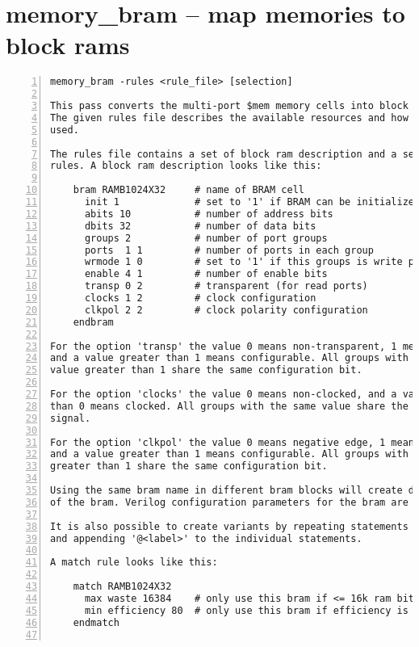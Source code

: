 \section{memory\_bram -- map memories to block rams}
\label{cmd:memory_bram}
\begin{lstlisting}[numbers=left,frame=single]
    memory_bram -rules <rule_file> [selection]

This pass converts the multi-port $mem memory cells into block ram instances.
The given rules file describes the available resources and how they should be
used.

The rules file contains a set of block ram description and a sequence of match
rules. A block ram description looks like this:

    bram RAMB1024X32     # name of BRAM cell
      init 1             # set to '1' if BRAM can be initialized
      abits 10           # number of address bits
      dbits 32           # number of data bits
      groups 2           # number of port groups
      ports  1 1         # number of ports in each group
      wrmode 1 0         # set to '1' if this groups is write ports
      enable 4 1         # number of enable bits
      transp 0 2         # transparent (for read ports)
      clocks 1 2         # clock configuration
      clkpol 2 2         # clock polarity configuration
    endbram

For the option 'transp' the value 0 means non-transparent, 1 means transparent
and a value greater than 1 means configurable. All groups with the same
value greater than 1 share the same configuration bit.

For the option 'clocks' the value 0 means non-clocked, and a value greater
than 0 means clocked. All groups with the same value share the same clock
signal.

For the option 'clkpol' the value 0 means negative edge, 1 means positive edge
and a value greater than 1 means configurable. All groups with the same value
greater than 1 share the same configuration bit.

Using the same bram name in different bram blocks will create different variants
of the bram. Verilog configuration parameters for the bram are created as needed.

It is also possible to create variants by repeating statements in the bram block
and appending '@<label>' to the individual statements.

A match rule looks like this:

    match RAMB1024X32
      max waste 16384    # only use this bram if <= 16k ram bits are unused
      min efficiency 80  # only use this bram if efficiency is at least 80%
    endmatch


\end{lstlisting}
